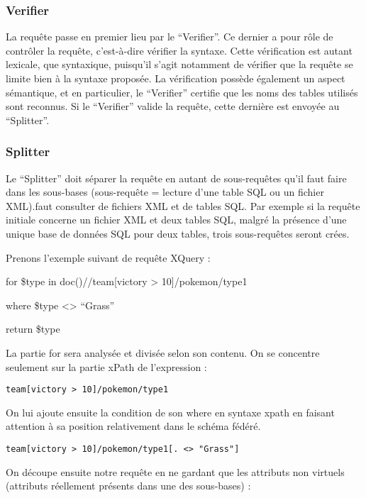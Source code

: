 \subsubsection{Verifier}

La requête passe en premier lieu par le “Verifier”. Ce dernier a pour rôle de contrôler la requête, c’est-à-dire vérifier la syntaxe. Cette vérification est autant lexicale, que syntaxique, puisqu’il s’agit notamment de vérifier que la requête se limite bien à la syntaxe proposée. La vérification possède également un aspect sémantique, et en particulier, le “Verifier” certifie que les noms des tables utilisés sont reconnus. Si le “Verifier” valide la requête, cette dernière est envoyée au “Splitter”.

\subsubsection{Splitter}

Le “Splitter” doit séparer la requête en autant de sous-requêtes qu’il faut faire dans les sous-bases (sous-requête = lecture d'une table SQL ou un fichier XML).faut consulter de fichiers XML et de tables SQL. Par exemple si la requête initiale concerne un fichier XML et deux tables SQL, malgré la présence d’une unique base de données SQL pour deux tables, trois sous-requêtes seront crées.

Prenons l’exemple suivant de requête XQuery :

for \$type in doc()//team[victory > 10]/pokemon/type1

where \$type <> “Grass”

return \$type

La partie for sera analysée et divisée selon son contenu. On se concentre seulement sur la partie xPath de l’expression :

\lstset{language=SQL}
\begin{lstlisting}
team[victory > 10]/pokemon/type1
\end{lstlisting}

On lui ajoute ensuite la condition de son where en syntaxe xpath en faisant attention à sa position relativement dans le schéma fédéré.

\lstset{language=SQL}
\begin{lstlisting}
team[victory > 10]/pokemon/type1[. <> "Grass"]
\end{lstlisting}

On découpe ensuite notre requête en ne gardant que les attributs non virtuels (attributs réellement présents dans une des sous-bases) :


